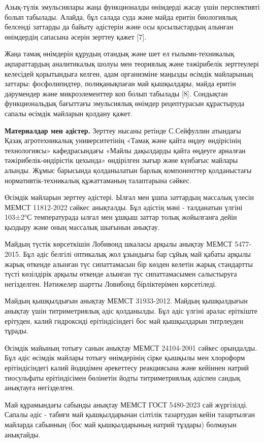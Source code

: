 \begin{multicols}{2}
Азық-түлік эмульсиялары жаңа функционалды өнімдерді жасау үшін
перспективті болып табылады. Алайда, бұл салада суда және майда еритін
биологиялық белсенді заттарды да байыту әдістерін және осы қосылыстардың
алынған өнімдердің сапасына әсерін зерттеу қажет {[}7{]}.

Жаңа тамақ өнімдерін құрудың отандық және шет ел ғылыми-техникалық
ақпараттардың аналитикалық шолуы мен теориялық және тәжірибелік
зерттеулері келесідей қорытындыға келген, адам организміне маңызды
өсімдік майларының заттары: фосфолипидтер, полиқанықпаған май
қышқылдары, майда еритін дәрумендер және микроэлементтер коп болып
табылады {[}8{]}. Сондықтан функциональдық бағыттағы эмульсиялық өнімдер
рецептурасын құрастыруда сапалы өсімдік майларын қолдану қажет.

{\bfseries Материалдар мен әдістер.} Зерттеу нысаны ретінде С.Сейфуллин
атындағы Қазақ агротехникалық университетінің «Тамақ және қайта өңдеу
өндірісінің технологиясы» кафедрасындағы «Майлы дақылдарды қайта өңдеуге
арналған тәжірибелік-өндірістік цехында» өндірілген зығыр және күнбағыс
майлары алынды. Жұмыс барысында қолданылатын барлық компоненттер
қолданыстағы нормативтік-техникалық құжаттаманың талаптарына сәйкес.

Өсімдік майларын зерттеу әдістері. Ылғал мен ұшпа заттардың массалық
үлесін МЕМСТ 11812-2022 сәйкес анықталды. Бұл әдістің мәні - талданатын
үлгіні 103±2°С температурада ылғал мен ұшқыш заттар толық жойылғанға
дейін қыздыру және оның массалық шығынын анықтау.

Майдың түстік көрсеткішін Лобивонд шкаласы арқылы анықтау МЕМСТ
5477-2015. Бұл әдіс белгілі оптикалық жол ұзындығы бар сұйық май қабаты
арқылы жарық өткенде алынған түс сипаттамасын бір көзден келетін жарық
стандартты түсті көзілдірік арқылы өткенде алынған түс сипаттамасымен
салыстыруға негізделген. Нәтижелер шартты Ловибонд бірліктерімен
көрсетіледі.

Майдың қышқылдығын анықтау МЕМСТ 31933-2012. Майдың қышқылдығын анықтау
үшін титриметриялық әдіс қолданылды. Бұл әдіс үлгіні аралас еріткіште
ерітуден, калий гидроксиді ерітіндісіндегі бос май қышқылдарын
титрлеуден тұрады.

Өсімдік майының тотығу санын анықтау МЕМСТ 24104-2001 сәйкес орындалды.
Бұл әдіс өсімдік майлары тотығу өнімдерінің сірке қышқылы мен хлороформ
ерітіндісіндегі калий йодидімен әрекеттесу реакциясына және кейіннен
натрий тиосульфаты ерітіндісімен бөлінетін йодты титриметриялық әдіспен
сандық анықтауға негізделген.

Май құрамындағы сабынды анықтау МЕМСТ ГОСТ 5480-2023 сай жүргізілді.
Сапалы әдіс - табиғи май қышқылдарынан сілтілік тазартудан кейін
тазартылған майларда сабынның (бос май қышқылдарының натрий тұздары)
болмауын анықтайды.


\end{multicols}
